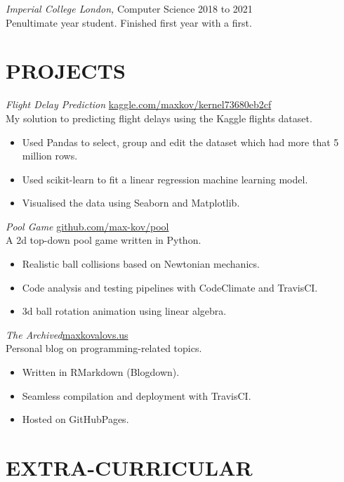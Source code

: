 \documentclass[margin, 10pt]{res} %
\begin{document}
\begin{resume}
{\sl Imperial College London,} Computer Science \hfill 2018 to 2021\\
Penultimate year student. Finished first year with a first.

\section{PROJECTS}

{\sl Flight Delay Prediction} \hfill \href{https://www.kaggle.com/maxkov/kernel73680eb2cf}{kaggle.com/maxkov/kernel73680eb2cf}\\
My solution to predicting flight delays using the Kaggle flights dataset.

\begin{itemize} \itemsep -2pt
\item Used Pandas to select, group and edit the dataset which had more that 5 million rows.
\item Used scikit-learn to fit a linear regression machine learning model.
\item Visualised the data using Seaborn and Matplotlib.
\end{itemize}

{\sl Pool Game} \hfill \href{https://github.com/max-kov/pool}{github.com/max-kov/pool}\\
A 2d top-down pool game written in Python.

\begin{itemize} \itemsep -2pt
\item Realistic ball collisions based on Newtonian mechanics.
\item Code analysis and testing pipelines with CodeClimate and TravisCI.
\item 3d ball rotation animation using linear algebra.
\end{itemize}

{\sl The Archived}\hfill \href{https://maxkovalovs.us}{maxkovalovs.us}\\
Personal blog on programming-related topics.

\begin{itemize} \itemsep -2pt
\item Written in RMarkdown (Blogdown).
\item Seamless compilation and deployment with TravisCI.
\item Hosted on GitHubPages.
\end{itemize}

\section{EXTRA-CURRICULAR} 


\end{resume}
\end{document}
